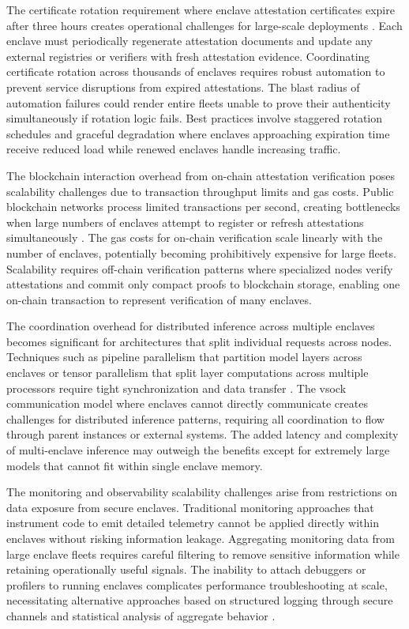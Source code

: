 The certificate rotation requirement where enclave attestation certificates expire after three hours creates operational challenges for large-scale deployments \cite{nitro_security}. Each enclave must periodically regenerate attestation documents and update any external registries or verifiers with fresh attestation evidence. Coordinating certificate rotation across thousands of enclaves requires robust automation to prevent service disruptions from expired attestations. The blast radius of automation failures could render entire fleets unable to prove their authenticity simultaneously if rotation logic fails. Best practices involve staggered rotation schedules and graceful degradation where enclaves approaching expiration time receive reduced load while renewed enclaves handle increasing traffic.

The blockchain interaction overhead from on-chain attestation verification poses scalability challenges due to transaction throughput limits and gas costs. Public blockchain networks process limited transactions per second, creating bottlenecks when large numbers of enclaves attempt to register or refresh attestations simultaneously \cite{blockchain_consensus}. The gas costs for on-chain verification scale linearly with the number of enclaves, potentially becoming prohibitively expensive for large fleets. Scalability requires off-chain verification patterns where specialized nodes verify attestations and commit only compact proofs to blockchain storage, enabling one on-chain transaction to represent verification of many enclaves.

The coordination overhead for distributed inference across multiple enclaves becomes significant for architectures that split individual requests across nodes. Techniques such as pipeline parallelism that partition model layers across enclaves or tensor parallelism that split layer computations across multiple processors require tight synchronization and data transfer \cite{model_serving}. The vsock communication model where enclaves cannot directly communicate creates challenges for distributed inference patterns, requiring all coordination to flow through parent instances or external systems. The added latency and complexity of multi-enclave inference may outweigh the benefits except for extremely large models that cannot fit within single enclave memory.

The monitoring and observability scalability challenges arise from restrictions on data exposure from secure enclaves. Traditional monitoring approaches that instrument code to emit detailed telemetry cannot be applied directly within enclaves without risking information leakage. Aggregating monitoring data from large enclave fleets requires careful filtering to remove sensitive information while retaining operationally useful signals. The inability to attach debuggers or profilers to running enclaves complicates performance troubleshooting at scale, necessitating alternative approaches based on structured logging through secure channels and statistical analysis of aggregate behavior \cite{monitoring_systems}.

